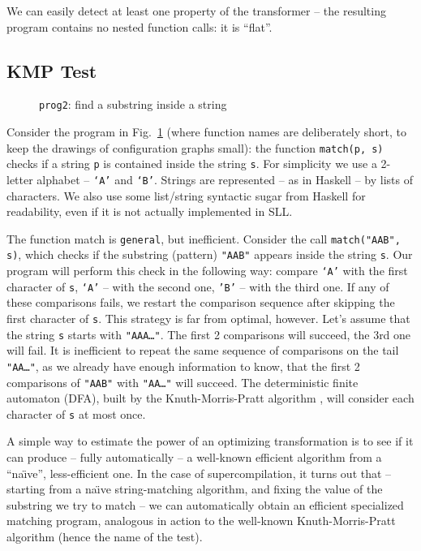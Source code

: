 We can easily detect at least one property of the transformer -- the resulting program
contains no nested function calls: it is ``flat''.

\subsection{KMP Test}

\begin{figure}[t!]
\caption{\texttt{prog2}: find a substring inside a string}
\label{fig:prog2}

\end{figure}

Consider the program in Fig.~\ref{fig:prog2}
(where function names are deliberately short, to keep the drawings of configuration
graphs small):
the function \texttt{match(p, s)} checks if a string \texttt{p}
is contained inside the string \texttt{s}.
For simplicity we use a 2-letter alphabet -- \texttt{`A'} and \texttt{`B'}.
Strings are represented -- as in Haskell -- by lists of characters.
We also use some list/string syntactic sugar from
Haskell for readability, even if it is not actually implemented in SLL.

The function match is \texttt{general}, but inefficient.
Consider the call \texttt{match("AAB", s)},
which checks if the substring (pattern) \texttt{"AAB"} appears inside the string \texttt{s}.
Our program will perform this check in the following way: compare \texttt{`A'}
with the first character of \texttt{s}, \texttt{`A'} -- with the second one,
\texttt{'B'} -- with the third one.
If any of these comparisons fails, we restart the comparison sequence
after skipping the first character of \texttt{s}.
This strategy is far from optimal, however.
Let's assume that the string \texttt{s} starts with \texttt{"AAA\ldots"}.
The first 2 comparisons will succeed, the 3rd one will fail.
It is inefficient to repeat the same sequence of comparisons
on the tail \texttt{"AA\ldots"},
as we already have enough information to know, that the first 2 comparisons of \texttt{"AAB"}
with \texttt{"AA\ldots"} will succeed.
The deterministic finite automaton (DFA), built by the Knuth-Morris-Pratt algorithm \cite{Knuth1977Fast},
will consider each character of \texttt{s} at most once.

A simple way to estimate the power of an optimizing transformation is to see if it
can produce -- fully automatically -- a well-known efficient algorithm
from a ``na\"{\i}ve'', less-efficient one.
In the case of supercompilation, it turns out that
-- starting from a na\"{\i}ve string-matching algorithm,
and fixing the value of the substring we try to match --
we can automatically obtain an efficient specialized matching program,
analogous in action to the well-known Knuth-Morris-Pratt algorithm
(hence the name of the test).


